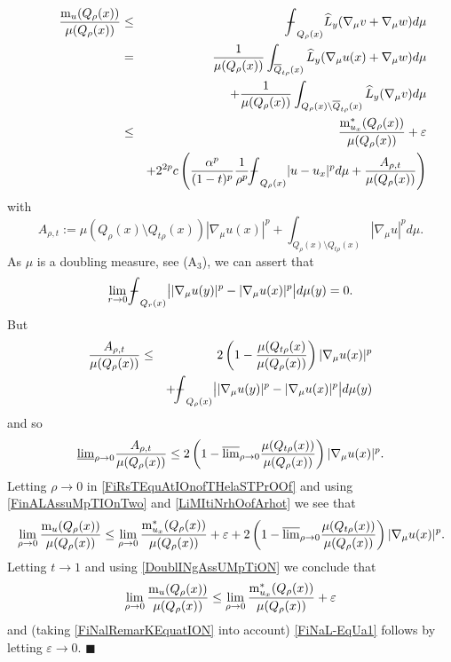 \documentclass[10pt]{amsart}
\numberwithin{equation}{section}
\theoremstyle{definition}
\theoremstyle{remark}
\begin{document}
\begin{eqnarray}
\qquad{{\rm m}_u(Q_\rho(x))\over\mu(Q_\rho(x))}&\leq&{{{\bf-}\!\!\!\!\!\!\hspace{-.1em}\int}}_{Q_\rho(x)}\widehat{L}_y(\nabla_\mu v+\nabla_\mu w)d\mu\label{FiRsTEquAtIOnofTHelaSTPrOOf}\\
&=&{1\over\mu(Q_\rho(x))}\int_{\overline{Q}_{t\rho}(x)}\widehat{L}_y(\nabla_\mu u(x)+\nabla_\mu w)d\mu\nonumber\\
&&+{1\over\mu(Q_\rho(x))}\int_{Q_\rho(x)\setminus \overline{Q}_{t\rho}(x)}\widehat{L}_y(\nabla_\mu v)d\mu\nonumber\\
&\leq &{{\rm m}^*_{u_x}(Q_\rho(x))\over\mu(Q_\rho(x))}+{\varepsilon}\nonumber\\
&& +2^{2p}c\left({\alpha^p\over(1-t)^p}{1\over\rho^p}{{{\bf-}\!\!\!\!\!\!\hspace{-.1em}\int}}_{Q_\rho(x)}|u-u_x|^pd\mu+{A_{\rho,t}\over\mu(Q_\rho(x))}\right)\nonumber
\end{eqnarray}
with
$$
A_{\rho,t}:=\mu(Q_\rho(x)\setminus Q_{t\rho}(x))|\nabla_\mu u(x)|^p+\int_{Q_\rho(x)\setminus Q_{t\rho}(x)}|\nabla_\mu u|^pd\mu.
$$
As $\mu$ is a doubling measure, see (A$_3$), we can assert that
$$
\lim_{r\to0}{{{\bf-}\!\!\!\!\!\!\hspace{-.1em}\int}}_{Q_r(x)}\big||\nabla_\mu u(y)|^p-|\nabla_\mu u(x)|^p\big|d\mu(y)=0.
$$
But
\begin{eqnarray*}
{A_{\rho,t}\over\mu(Q_\rho(x))}&\leq& 2\left(1-{\mu(Q_{t\rho}(x)\over\mu(Q_\rho(x))}\right)|\nabla_\mu u(x)|^p\\
&&+{{{\bf-}\!\!\!\!\!\!\hspace{-.1em}\int}}_{Q_\rho(x)}\big||\nabla_\mu u(y)|^p-|\nabla_\mu u(x)|^p\big|d\mu(y)
\end{eqnarray*}
and so
\begin{equation}\label{LiMItiNrhOofArhot}
{\mathop{\underline{\lim}}}_{\rho\to0}{A_{\rho,t}\over\mu(Q_\rho(x))}\leq 2\left(1-{\mathop{\overline{\lim}}}_{\rho\to0}{\mu(Q_{t\rho}(x))\over\mu(Q_\rho(x))}\right)|\nabla_\mu u(x)|^p.
\end{equation}
Letting $\rho\to 0$ in \eqref{FiRsTEquAtIOnofTHelaSTPrOOf} and using \eqref{FinALAssuMpTIOnTwo} and  \eqref{LiMItiNrhOofArhot} we see that
$$
\lim_{\rho\to0}{{\rm m}_u(Q_\rho(x))\over\mu(Q_\rho(x))}\leq \lim_{\rho\to0}{{\rm m}^*_{u_x}(Q_\rho(x))\over\mu(Q_\rho(x))}+{\varepsilon}+2\left(1-{\mathop{\overline{\lim}}}_{\rho\to0}{\mu(Q_{t\rho}(x))\over\mu(Q_\rho(x))}\right)|\nabla_\mu u(x)|^p.
$$
Letting $t\to 1$ and using \eqref{DoublINgAssUMpTiON} we conclude that
$$
\lim_{\rho\to0}{{\rm m}_u(Q_\rho(x))\over\mu(Q_\rho(x))}\leq \lim_{\rho\to0}{{\rm m}^*_{u_x}(Q_\rho(x))\over\mu(Q_\rho(x))}+{\varepsilon}
$$
and (taking \eqref{FiNalRemarKEquatION} into account) \eqref{FiNaL-EqUa1} follows by letting ${\varepsilon}\to0$. {$\blacksquare$} 
\end{document}
